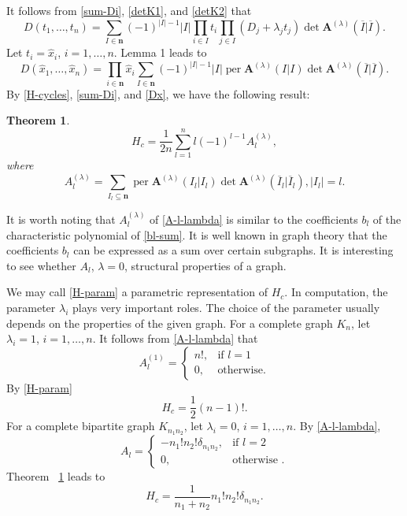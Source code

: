 \documentclass{article}
\newtheorem{thm}{Theorem}[section]
\theoremstyle{definition}
\theoremstyle{remark}
\DeclareMathOperator{\per}{per}
\newcommand{\envert}[1]{\left\lvert#1\right\rvert}
\let\abs=\envert
\begin{document}
It follows from \eqref{sum-Di}, \eqref{detK1}, and \eqref{detK2} that
\begin{equation}\label{Dt}
D(t_1,\dots,t_n)=\sum_{I\in\mathbf{n}}(-1)^{\abs{I}-1}\abs{I}
\prod_{i\in I}t_i\prod_{j\in I}(D_j+\lambda_jt_j)\det\mathbf{A}^{(\lambda)}
(\overline I|\overline I).
\end{equation}
Let $t_i=\hat x_i$, $i=1,\dots,n$. Lemma 1 leads to
\begin{equation}\label{Dx}
D(\hat x_1,\dots,\hat x_n)=\prod_{i\in\mathbf{n}}\hat x_i
\sum_{I\in\mathbf{n}}(-1)^{\abs{I}-1}\abs{I}\per \mathbf{A}
^{(\lambda)}(I|I)\det\mathbf{A}^{(\lambda)}(\overline I|\overline I).
\end{equation}
By \eqref{H-cycles}, \eqref{sum-Di}, and \eqref{Dx},
we have the following result:
\begin{thm}\label{thm-H-param}
\begin{equation}\label{H-param}
H_c=\frac{1}{2n}\sum^n_{l =1}l (-1)^{l -1}A_{l}
^{(\lambda)},
\end{equation}
where
\begin{equation}\label{A-l-lambda}
A^{(\lambda)}_l =\sum_{I_l \subseteq\mathbf{n}}\per \mathbf{A}
^{(\lambda)}(I_l |I_l )\det\mathbf{A}^{(\lambda)}
(\overline I_{l}|\overline I_l ),\abs{I_{l}}=l .
\end{equation}
\end{thm}

It is worth noting that $A_l ^{(\lambda)}$ of \eqref{A-l-lambda} is
similar to the coefficients $b_l $ of the characteristic polynomial of
\eqref{bl-sum}. It is well known in graph theory that the coefficients
$b_l $ can be expressed as a sum over certain subgraphs. It is
interesting to see whether $A_l $, $\lambda=0$, structural properties
of a graph.

We may call \eqref{H-param} a parametric representation of $H_c$. In
computation, the parameter $\lambda_i$ plays very important roles. The
choice of the parameter usually depends on the properties of the given
graph. For a complete graph $K_n$, let $\lambda_i=1$, $i=1,\dots,n$.
It follows from \eqref{A-l-lambda} that
\begin{equation}\label{compl-gr}
A^{(1)}_l =\begin{cases} n!,&\text{if }l =1\\
0,&\text{otherwise}.\end{cases}
\end{equation}
By \eqref{H-param}
\begin{equation}
H_c=\frac 12(n-1)!.
\end{equation}
For a complete bipartite graph $K_{n_1n_2}$, let $\lambda_i=0$, $i=1,\dots,n$.
By \eqref{A-l-lambda},
\begin{equation}
A_l =
\begin{cases} -n_1!n_2!\delta_{n_1n_2},&\text{if }l =2\\
0,&\text{otherwise }.\end{cases}
\label{compl-bip-gr}
\end{equation}
Theorem ~\ref{thm-H-param}
leads to
\begin{equation}
H_c=\frac1{n_1+n_2}n_1!n_2!\delta_{n_1n_2}.
\end{equation}
\end{document}
